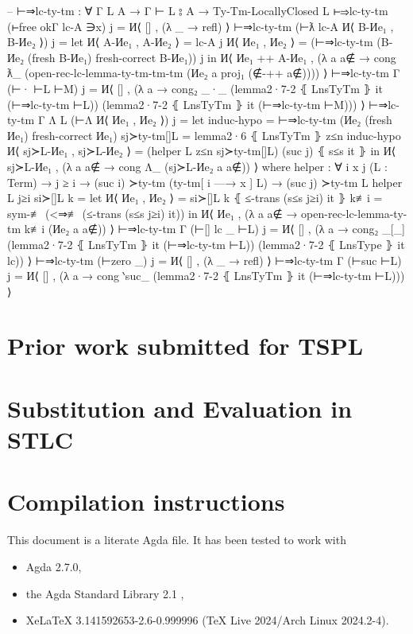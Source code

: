 \documentclass[logo,bsc,singlespacing,parskip,online]{infthesis}
\renewenvironment{code}{\mintedcopy[breaklines,breaksymbolleft=\;]{agda}}{\endmintedcopy}
\begin{document}
\begin{code}
  -- ⊢⇒lc-ty-tm : ∀ {Γ L A} → Γ ⊢ L ⦂ A → Ty-Tm-LocallyClosed L
  ⊢⇒lc-ty-tm (⊢free okΓ lc-A ∋x) j = И⟨ [] , (λ _ → refl) ⟩
  ⊢⇒lc-ty-tm (⊢ƛ lc-A И⟨ B-Иe₁ , B-Иe₂ ⟩) j =
    let И⟨ A-Иe₁ , A-Иe₂ ⟩ = lc-A j
        И⟨ Иe₁ , Иe₂ ⟩ = (⊢⇒lc-ty-tm (B-Иe₂ (fresh B-Иe₁) {fresh-correct B-Иe₁})) j
    in И⟨ Иe₁ ++ A-Иe₁ , (λ a {a∉} → cong ƛ_
      (open-rec-lc-lemma-ty-tm-tm-tm (Иe₂ a {proj₁ (∉-++ a∉)}))) ⟩
  ⊢⇒lc-ty-tm {Γ} (⊢· ⊢L ⊢M) j = И⟨ [] , (λ a → cong₂ _·_
    (lemma2·7-2 ⦃ LnsTyTm ⦄ it (⊢⇒lc-ty-tm ⊢L))
    (lemma2·7-2 ⦃ LnsTyTm ⦄ it (⊢⇒lc-ty-tm ⊢M))) ⟩
  ⊢⇒lc-ty-tm {Γ} {Λ L} (⊢Λ И⟨ Иe₁ , Иe₂ ⟩) j =
      let induc-hypo = ⊢⇒lc-ty-tm (Иe₂ (fresh Иe₁) {fresh-correct Иe₁})
          sj≻ty-tm[]L = lemma2·6 ⦃ LnsTyTm ⦄ z≤n induc-hypo
          И⟨ sj≻L-Иe₁ , sj≻L-Иe₂ ⟩ = (helper L z≤n sj≻ty-tm[]L) (suc j) ⦃ s≤s it ⦄
      in И⟨ sj≻L-Иe₁ , (λ a {a∉} → cong Λ_ (sj≻L-Иe₂ a {a∉})) ⟩
    where
      helper : ∀ {i x j} (L : Term) → j ≥ i → (suc i) ≻ty-tm (ty-tm[ i —→ x ] L) → (suc j) ≻ty-tm L
      helper L j≥i si≻[]L k =
        let И⟨ Иe₁ , Иe₂ ⟩ = si≻[]L k ⦃ ≤-trans (s≤s j≥i) it ⦄
            k≢i = sym-≢ (<⇒≢ (≤-trans (s≤s j≥i) it))
        in И⟨ Иe₁ , (λ a {a∉} → open-rec-lc-lemma-ty-tm k≢i (Иe₂ a {a∉})) ⟩
  ⊢⇒lc-ty-tm {Γ} (⊢[] lc _ ⊢L) j = И⟨ [] , (λ a → cong₂ _[_]
    (lemma2·7-2 ⦃ LnsTyTm ⦄ it (⊢⇒lc-ty-tm ⊢L))
    (lemma2·7-2 ⦃ LnsType ⦄ it lc)) ⟩
  ⊢⇒lc-ty-tm (⊢zero _) j = И⟨ [] , (λ _ → refl) ⟩
  ⊢⇒lc-ty-tm {Γ} (⊢suc ⊢L) j = И⟨ [] , (λ a →
    cong ‵suc_ (lemma2·7-2 ⦃ LnsTyTm ⦄ it (⊢⇒lc-ty-tm ⊢L))) ⟩
\end{code}

\chapter{Prior work submitted for TSPL}
\label{appendix:tspl}


\chapter{Substitution and Evaluation in STLC}
\label{appendix:stlc_sub_and_eval}


\chapter{Compilation instructions}
\label{appendix:compilation_instructions}

This document is a literate Agda file. It has been tested to work with
\begin{itemize}
  \item Agda 2.7.0,
  \item the Agda Standard Library 2.1 \citep{the_agda_community_agda_2024},
  \item XeLaTeX 3.141592653-2.6-0.999996 (TeX Live 2024/Arch Linux 2024.2-4).
\end{itemize}
\end{document}
